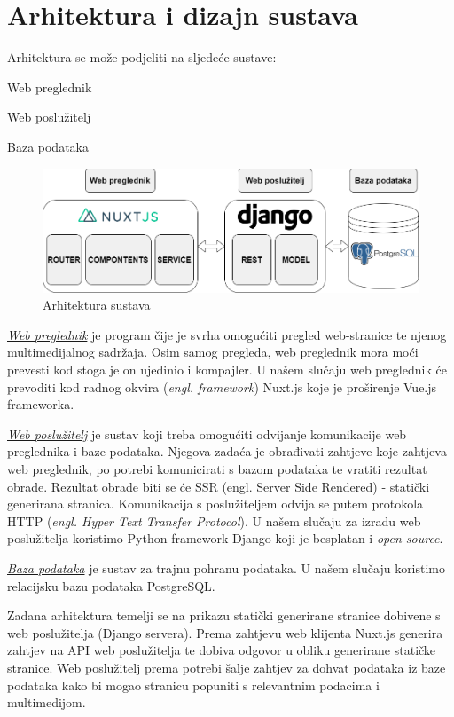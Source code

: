 \chapter{Arhitektura i dizajn sustava}
		
	Arhitektura se može podjeliti na sljedeće sustave:
\begin{packed_item}
	\item 	Web preglednik
	\item 	Web poslužitelj
	\item 	Baza podataka
\end{packed_item}	

\begin{figure}[H]
	\centering
	\includegraphics[scale=0.45]{slike/ARHITEKTURA.PNG}
	\caption{Arhitektura sustava}
	\label{fig:promjene}
\end{figure}	

\underline{\textit{Web preglednik}} je program čije je svrha omogućiti pregled web-stranice te njenog multimedijalnog sadržaja. Osim samog pregleda, web preglednik mora moći prevesti kod stoga je on ujedinio i kompajler. U našem slučaju web preglednik će prevoditi kod radnog okvira (\emph{engl. framework}) Nuxt.js koje je proširenje Vue.js frameworka.

\underline{\textit{Web poslužitelj}} je sustav koji treba omogućiti odvijanje komunikacije web preglednika i baze podataka. Njegova zadaća je obrađivati zahtjeve koje zahtjeva web preglednik, po potrebi komunicirati s bazom podataka te vratiti rezultat obrade. Rezultat obrade biti se će SSR (engl. Server Side Rendered) - statički generirana stranica. Komunikacija s poslužiteljem odvija se putem protokola HTTP (\emph{engl. Hyper Text Transfer Protocol}). U našem slučaju za izradu web poslužitelja koristimo Python framework Django koji je besplatan i \emph{open source}.

\underline{\textit{Baza podataka}} je sustav za trajnu pohranu podataka. U našem slučaju koristimo relacijsku bazu podataka PostgreSQL.

Zadana arhitektura temelji se na prikazu statički generirane stranice dobivene s web poslužitelja (Django servera). Prema zahtjevu web klijenta Nuxt.js generira zahtjev na API web poslužitelja te dobiva odgovor u obliku generirane statičke stranice. Web poslužitelj prema potrebi šalje zahtjev za dohvat podataka iz baze podataka kako bi mogao stranicu popuniti s relevantnim podacima i multimedijom.

